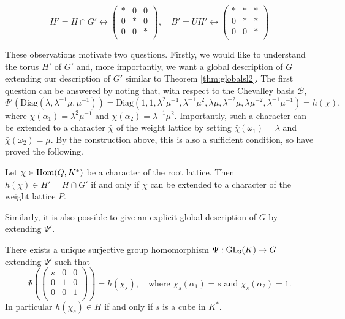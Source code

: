 \begin{equation*}
    H'=H\cap G' \longleftrightarrow\begin{pmatrix}
        * & 0 & 0\\
        0 & * & 0\\
        0 & 0 & *\\
    \end{pmatrix},\quad B'=UH'\longleftrightarrow\begin{pmatrix}
        * & * & *\\
        0 & * & *\\
        0 & 0 & *\\
    \end{pmatrix}
\end{equation*}

These observations motivate two questions. Firstly, we would like to understand the torus $H'$ of $G'$ and, more importantly, we want a global description of $G$ extending our description of $G'$ similar to Theorem \ref{thm:globalsl2}. The first question can be answered by noting that, with respect to the Chevalley basis $\mathcal{B}$,
$$\Psi'(\mathrm{Diag}(\lambda,\lambda^{-1}\mu,\mu^{-1}))=\mathrm{Diag}(1,1,\lambda^2\mu^{-1},\lambda^{-1}\mu^2,\lambda\mu,\lambda^{-2}\mu,\lambda\mu^{-2},\lambda^{-1}\mu^{-1})=h(\chi),$$
where $\chi(\alpha_1)=\lambda^2\mu^{-1}$ and $\chi(\alpha_2)=\lambda^{-1}\mu^2$. Importantly, such a character can be extended to a character $\bar{\chi}$ of the weight lattice by setting $\bar\chi(\omega_1)=\lambda$ and $\bar\chi(\omega_2)=\mu$. By the construction above, this is also a sufficient condition, so have proved the following.

\begin{lemma}
    Let $\chi\in\mathrm{Hom}(Q,K^*)$ be a character of the root lattice. Then $h(\chi)\in H'=H\cap G'$ if and only if $\chi$ can be extended to a character of the weight lattice $P$.
\end{lemma}

Similarly, it is also possible to give an explicit global description of $G$ by extending $\Psi'$. 

\begin{theorem}
    There exists a unique surjective group homomorphism $\Psi:\mathrm{GL}_3(K)\to G$ extending $\Psi'$ such that 
    $$\Psi\left(\begin{pmatrix}
        s & 0 & 0\\
        0 & 1 & 0\\
        0 & 0 & 1\\
    \end{pmatrix}\right)=h(\chi_s),\quad\text{where }\chi_s(\alpha_1)=s\text{ and }\chi_s(\alpha_2)=1.$$
    In particular $h(\chi_s)\in H$ if and only if $s$ is a cube in $K^*$.
\end{theorem}


